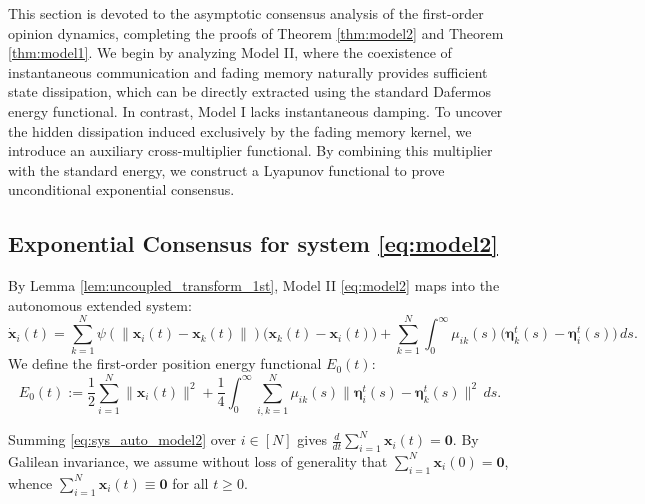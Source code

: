 \documentclass[11pt]{amsart}
\numberwithin{equation}{section}
\begin{document}
This section is devoted to the asymptotic consensus analysis of the first-order opinion dynamics, completing the proofs of Theorem \ref{thm:model2} and Theorem \ref{thm:model1}. We begin by analyzing Model II, where the coexistence of instantaneous communication and fading memory naturally provides sufficient state dissipation, which can be directly extracted using the standard Dafermos energy functional. In contrast, Model I lacks instantaneous damping. To uncover the hidden dissipation induced exclusively by the fading memory kernel, we introduce an auxiliary cross-multiplier functional. By combining this multiplier with the standard energy, we construct a  Lyapunov functional to prove unconditional exponential consensus.

\subsection{Exponential Consensus for system \eqref{eq:model2}}
By Lemma \ref{lem:uncoupled_transform_1st}, Model II \eqref{eq:model2} maps into the autonomous extended system:
\begin{equation}\label{eq:sys_auto_model2}
\dot{\boldsymbol{x}}_i(t) = \sum_{k=1}^N \psi(\|\boldsymbol{x}_i(t)-\boldsymbol{x}_k(t)\|)\big(\boldsymbol{x}_k(t) - \boldsymbol{x}_i(t)\big) + \sum_{k=1}^N\int_0^\infty \mu_{ik}(s)\big(\boldsymbol{\eta}_k^t(s) - \boldsymbol{\eta}_i^t(s)\big)\,ds.
\end{equation}
We define the first-order position energy functional $E_0(t)$:
\begin{equation*}\label{eq:E0_def}
E_0(t) := \frac{1}{2}\sum_{i=1}^N\|\boldsymbol{x}_i(t)\|^2 + \frac{1}{4}\int_0^\infty\sum_{i,k=1}^N \mu_{ik}(s)\|\boldsymbol{\eta}_i^t(s)-\boldsymbol{\eta}_k^t(s)\|^2\,ds.
\end{equation*}

 Summing \eqref{eq:sys_auto_model2} over $i \in [N]$ gives $\frac{d}{dt}\sum\limits_{i=1}^N \boldsymbol{x}_i(t) = \mathbf{0}$. By Galilean invariance, we assume without loss of generality that $\sum\limits_{i=1}^N \boldsymbol{x}_i(0) = \mathbf{0}$, whence $\sum\limits_{i=1}^N \boldsymbol{x}_i(t) \equiv \mathbf{0}$ for all $t \ge 0$.
\end{document}
